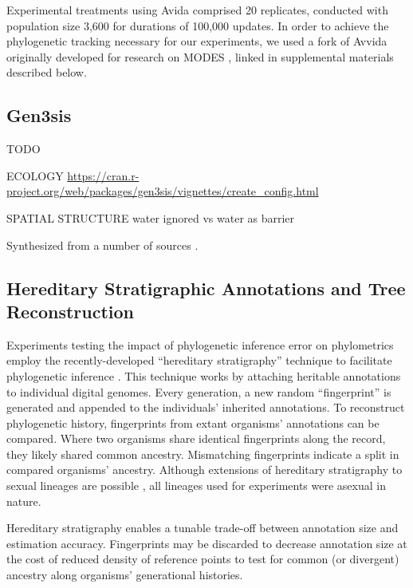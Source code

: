 Experimental treatments using Avida comprised 20 replicates, conducted with population size 3,600 for durations of 100,000 updates.
In order to achieve the phylogenetic tracking necessary for our experiments, we used a fork of Avvida originally developed for research on MODES \citep{dolsonMODESToolboxMeasurements2019}, linked in supplemental materials described below.

\subsection{Gen3sis}

TODO \citep{hagen2021gen3sis}

ECOLOGY \url{https://cran.r-project.org/web/packages/gen3sis/vignettes/create_config.html}

SPATIAL STRUCTURE
water ignored vs water as barrier

Synthesized from a number of sources \citep{straume2020global,westerhold2020astronomically,fick2017worldclim,hagen2019mountain,annan2013new,cramwinckel2018synchronous,evans2018eocene,hollis2019deepmip,hutchinson2018climate,keating2011warm,sijp2014role,zhang2019evolution}.


\subsection{Hereditary Stratigraphic Annotations and Tree Reconstruction}

Experiments testing the impact of phylogenetic inference error on phylometrics employ the recently-developed ``hereditary stratigraphy'' technique to facilitate phylogenetic inference \citep{moreno2022hstrat}.
This technique works by attaching heritable annotations to individual digital genomes.
Every generation, a new random ``fingerprint'' is generated and appended to the individuals' inherited annotations.
To reconstruct phylogenetic history, fingerprints from extant organisms' annotations can be compared.
Where two organisms share identical fingerprints along the record, they likely shared common ancestry.
Mismatching fingerprints indicate a split in compared organisms' ancestry.
Although extensions of hereditary stratigraphy to sexual lineages are possible \citep{moreno2024methods}, all lineages used for experiments were asexual in nature.

Hereditary stratigraphy enables a tunable trade-off between annotation size and estimation accuracy.
Fingerprints may be discarded to decrease annotation size at the cost of reduced density of reference points to test for common (or divergent) ancestry along organisms' generational histories.


